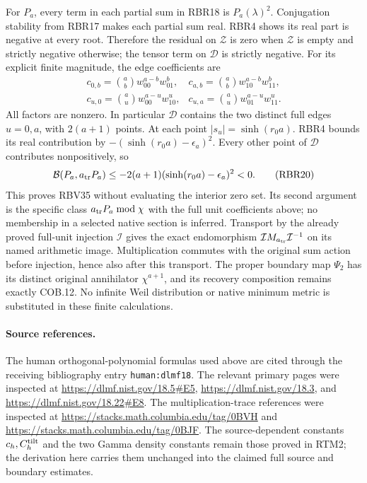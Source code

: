 For $P_a$, every term in each partial sum in RBR18 is
$P_a(\lambda)^2$. Conjugation stability from RBR17 makes each
partial sum real. RBR4 shows its real part is negative at
every root. Therefore the residual on $\mathcal Z$ is zero
when $\mathcal Z$ is empty and strictly negative otherwise;
the tensor term on $\mathcal D$ is strictly negative.
For its explicit finite magnitude, the edge coefficients are
\[
\begin{array}{ll}
 c_{0,b}=\binom ab w_{00}^{a-b}w_{01}^{b},&
 c_{a,b}=\binom ab w_{10}^{a-b}w_{11}^{b},\\
 c_{u,0}=\binom au w_{00}^{a-u}w_{10}^{u},&
 c_{u,a}=\binom au w_{01}^{a-u}w_{11}^{u}.
\end{array}                                                     \tag{RBR19}
\]
All factors are nonzero. In particular $\mathcal D$ contains
the two distinct full edges $u=0,a$, with $2(a+1)$ points.
At each point $|s_u|=\sinh(r_0a)$. RBR4 bounds its real
contribution by $-(\sinh(r_0a)-\epsilon_a)^2$.
Every other point of $\mathcal D$ contributes nonpositively,
so
\[
 \mathcal B(P_a,a_{\rm tr}P_a)
 \le-2(a+1)(\sinh(r_0a)-\epsilon_a)^2<0 .
 \tag{RBR20}
\]
This proves RBV35 without evaluating the interior zero set.
Its second argument is the specific class
$a_{\rm tr}P_a\bmod\chi$ with the full unit coefficients above;
no membership in a selected native section is inferred.
Transport by the already proved full-unit injection
$\mathcal I$ gives the exact endomorphism
$\mathcal I M_{a_{\rm tr}}\mathcal I^{-1}$ on its named
arithmetic image. Multiplication commutes with the original
sum action before injection, hence also after this transport.
The proper boundary map $\Psi_2$ has its distinct original
annihilator $\chi^{a+1}$, and its recovery composition remains
exactly COB.12. No infinite Weil distribution or native
minimum metric is substituted in these finite calculations.

\paragraph{Source references.}
The human orthogonal-polynomial formulas used above are cited
through the receiving bibliography entry \texttt{human:dlmf18}.
The relevant primary pages were inspected at
\url{https://dlmf.nist.gov/18.5#E5},
\url{https://dlmf.nist.gov/18.3}, and
\url{https://dlmf.nist.gov/18.22#E8}.
The multiplication-trace references were inspected at
\url{https://stacks.math.columbia.edu/tag/0BVH} and
\url{https://stacks.math.columbia.edu/tag/0BJF}.
The source-dependent constants $c_h,C_h^{\rm tilt}$ and the two
Gamma density constants remain those proved in RTM2; the
derivation here carries them unchanged into the claimed full
source and boundary estimates.
\endgroup
